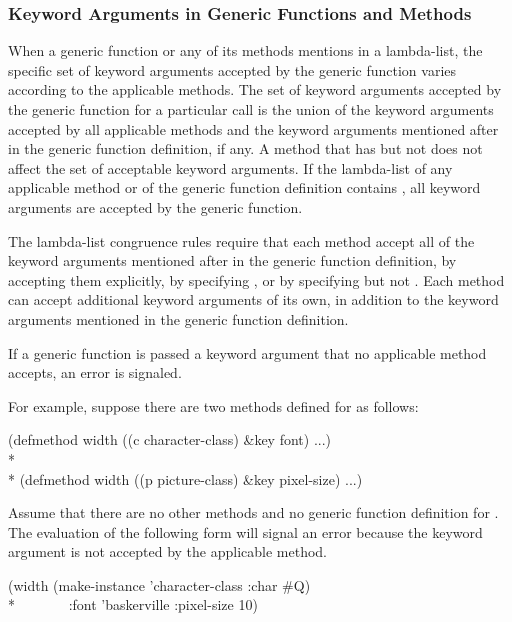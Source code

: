 \subsubsection{Keyword Arguments in Generic Functions and Methods}

When a generic function or any of its methods mentions  in
a lambda-list, the specific set of keyword arguments accepted by the
generic function varies according to the applicable methods.  The set
of keyword arguments accepted by the generic function for a particular
call is the union of the keyword arguments accepted by all applicable
methods and the keyword arguments mentioned after  in the
generic function definition, if any.  A method that has 
but not  does not affect the set of acceptable keyword
arguments.  If the lambda-list of any applicable method or of the
generic function definition contains , all
keyword arguments are accepted by the generic function.

The lambda-list congruence rules require that each method
accept all of the keyword arguments mentioned after  in the
generic function definition, by accepting them explicitly, by
specifying , or by specifying  but
not .  Each method can accept additional keyword arguments
of its own, in addition to the keyword arguments mentioned in the
generic function definition.


If a generic function is passed a keyword argument that no applicable
method accepts, an error is signaled.

For example, suppose there are two methods defined for 
as follows:

\begin{lisp}
(defmethod width ((c character-class) \&key font) ...)\\*
\\*
(defmethod width ((p picture-class) \&key pixel-size) ...)
\end{lisp}

\noindent Assume that there are no other methods and no generic
function definition for . The evaluation of the
following form will signal an error because the keyword argument
 is not accepted by the applicable method.

\begin{lisp}
(width (make-instance 'character-class :char \#{\Xbackslash}Q) \\*
~~~~~~~:font 'baskerville :pixel-size 10)
\end{lisp}

